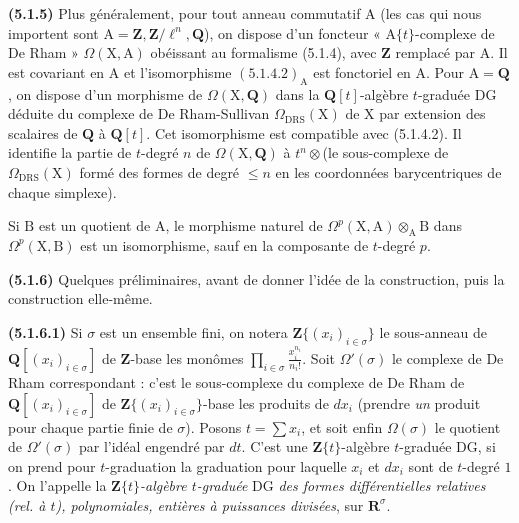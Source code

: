 \documentclass[11pt,leqno]{article}
\begin{document}
\textbf{(5.1.5)} Plus généralement, pour tout anneau commutatif \(\mathrm{A}\) (les cas qui nous importent sont \(\mathrm{A}=\mathbf{Z},\mathbf{Z}/\ell^n,\mathbf{Q}\)), on dispose d’un foncteur « \(\mathrm{A}\{t\}\)-complexe de De Rham » \(\Omega(\mathrm{X},\mathrm{A})\) obéissant au formalisme (5.1.4), avec \(\mathbf{Z}\) remplacé par \(\mathrm{A}\). Il est covariant en \(\mathrm{A}\) et l’isomorphisme \((5.1.4.2)_{\mathrm{A}}\) est fonctoriel en \(\mathrm{A}\). Pour \(\mathrm{A}=\mathbf{Q}\), on dispose d’un morphisme de \(\Omega(\mathrm{X},\mathbf{Q})\) dans la \(\mathbf{Q}[t]\)-algèbre \(t\)-graduée DG déduite du complexe de De Rham-Sullivan \(\Omega_{\mathrm{DRS}}(\mathrm{X})\) de \(\mathrm{X}\) par extension des scalaires de \(\mathbf{Q}\) à \(\mathbf{Q}[t]\). Cet isomorphisme est compatible avec (5.1.4.2). Il identifie la partie de \(t\)-degré \(n\) de \(\Omega(\mathrm{X},\mathbf{Q})\) à \(t^n\otimes\)(le sous-complexe de \(\Omega_{\mathrm{DRS}}(\mathrm{X})\) formé des formes de degré \(\leq n\) en les coordonnées barycentriques de chaque simplexe).

Si \(\mathrm{B}\) est un quotient de \(\mathrm{A}\), le morphisme naturel de \(\Omega^p(\mathrm{X},\mathrm{A})\otimes_{\mathrm{A}}\mathrm{B}\) dans \(\Omega^p(\mathrm{X},\mathrm{B})\) est un isomorphisme, sauf en la composante de \(t\)-degré \(p\).

\textbf{(5.1.6)} Quelques préliminaires, avant de donner l’idée de la construction, puis la construction elle-même.

\textbf{(5.1.6.1)} Si \(\sigma\) est un ensemble fini, on notera \(\mathbf{Z}\{(x_i)_{i\in\sigma}\}\) le sous-anneau de \(\mathbf{Q}[(x_i)_{i\in\sigma}]\) de \(\mathbf{Z}\)-base les monômes \(\prod\limits_{i\in\sigma}\frac{x_i^{n_i}}{n_i!}\). Soit \(\Omega'(\sigma)\) le complexe de De Rham correspondant : c’est le sous-complexe du complexe de De Rham de \(\mathbf{Q}[(x_i)_{i\in\sigma}]\) de \(\mathbf{Z}\{(x_i)_{i\in\sigma}\}\)-base les produits de \(dx_i\) (prendre \textit{un} produit pour chaque partie finie de \(\sigma\)). Posons \(t=\sum x_i\), et soit enfin \(\Omega(\sigma)\) le quotient de \(\Omega'(\sigma)\) par l’idéal engendré par \(dt\). C’est une \(\mathbf{Z}\{t\}\)-algèbre \(t\)-graduée DG, si on prend pour \(t\)-graduation la graduation pour laquelle \(x_i\) et \(dx_i\) sont de \(t\)-degré \(1\). On l’appelle la \(\mathbf{Z}\{t\}\)\textit{-algèbre \(t\)-graduée} DG \textit{des formes différentielles relatives (rel. à \(t\)), polynomiales, entières à puissances divisées}, sur \(\mathbf{R}^{\sigma}\).
\end{document}
